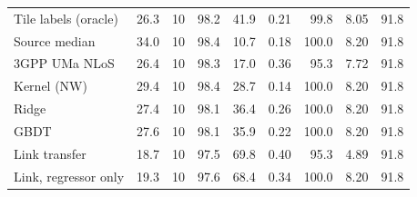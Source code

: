 \begin{tabular}{lrrrrrrrr}
Tile labels (oracle) & 26.3 & 10 & 98.2 & 41.9 & 0.21 & 99.8 & 8.05 & 91.8 \\
Source median & 34.0 & 10 & 98.4 & 10.7 & 0.18 & 100.0 & 8.20 & 91.8 \\
3GPP UMa NLoS & 26.4 & 10 & 98.3 & 17.0 & 0.36 & 95.3 & 7.72 & 91.8 \\
Kernel (NW) & 29.4 & 10 & 98.4 & 28.7 & 0.14 & 100.0 & 8.20 & 91.8 \\
Ridge & 27.4 & 10 & 98.1 & 36.4 & 0.26 & 100.0 & 8.20 & 91.8 \\
GBDT & 27.6 & 10 & 98.1 & 35.9 & 0.22 & 100.0 & 8.20 & 91.8 \\
Link transfer & 18.7 & 10 & 97.5 & 69.8 & 0.40 & 95.3 & 4.89 & 91.8 \\
Link, regressor only & 19.3 & 10 & 97.6 & 68.4 & 0.34 & 100.0 & 8.20 & 91.8 \\
\bottomrule
\end{tabular}
